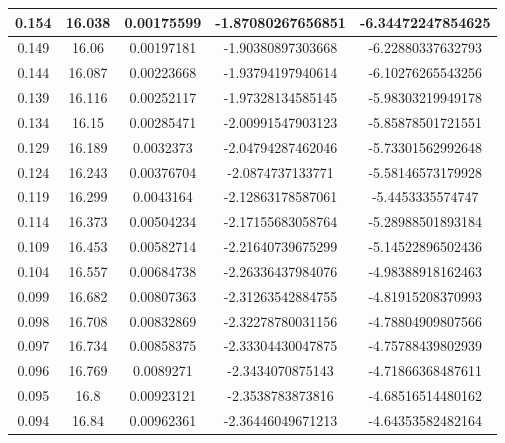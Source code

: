 \documentclass[letterpaper]{article}
\begin{document}
\begin{table}[H]
{\begin{tabular}{|c|c|c|c|c|}
   0.154          & 16.038              & 0.00175599            & -1.87080267656851  & -6.34472247854625 \\ \hline
   0.149          & 16.06               & 0.00197181            & -1.90380897303668  & -6.22880337632793 \\ \hline
   0.144          & 16.087              & 0.00223668            & -1.93794197940614  & -6.10276265543256 \\ \hline
   0.139          & 16.116              & 0.00252117            & -1.97328134585145  & -5.98303219949178 \\ \hline
   0.134          & 16.15               & 0.00285471            & -2.00991547903123  & -5.85878501721551 \\ \hline
   0.129          & 16.189              & 0.0032373             & -2.04794287462046  & -5.73301562992648 \\ \hline
   0.124          & 16.243              & 0.00376704            & -2.0874737133771   & -5.58146573179928 \\ \hline
   0.119          & 16.299              & 0.0043164             & -2.12863178587061  & -5.4453335574747  \\ \hline
   0.114          & 16.373              & 0.00504234            & -2.17155683058764  & -5.28988501893184 \\ \hline
   0.109          & 16.453              & 0.00582714            & -2.21640739675299  & -5.14522896502436 \\ \hline
   0.104          & 16.557              & 0.00684738            & -2.26336437984076  & -4.98388918162463 \\ \hline
   0.099          & 16.682              & 0.00807363            & -2.31263542884755  & -4.81915208370993 \\ \hline
   0.098          & 16.708              & 0.00832869            & -2.32278780031156  & -4.78804909807566 \\ \hline
   0.097          & 16.734              & 0.00858375            & -2.33304430047875  & -4.75788439802939 \\ \hline
   0.096          & 16.769              & 0.0089271             & -2.3434070875143   & -4.71866368487611 \\ \hline
   0.095          & 16.8                & 0.00923121            & -2.3538783873816   & -4.68516514480162 \\ \hline
   0.094          & 16.84               & 0.00962361            & -2.36446049671213  & -4.64353582482164 \\ \hline

\end{tabular}}
\end{table}
\end{document}
